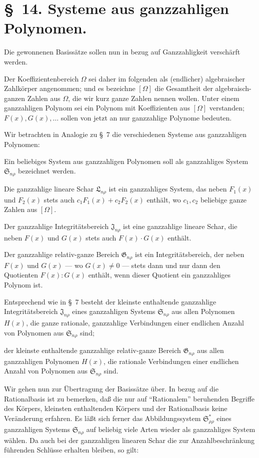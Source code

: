 \documentclass[11pt]{article}
\providecommand{\Ssys}{\mathfrak{S}}
\providecommand{\Jdom}{\mathfrak{J}}
\providecommand{\Gdom}{\mathfrak{G}}
\providecommand{\Lsys}{\mathfrak{L}}
\begin{document}
\section*{\S\ 14. Systeme aus ganzzahligen Polynomen.}

Die gewonnenen Basissätze sollen nun in bezug auf Ganzzahligkeit verschärft werden.

Der Koeffizientenbereich $\Omega$ sei daher im folgenden als (endlicher) algebraischer Zahlkörper angenommen; und es bezeichne $[\Omega]$ die Gesamtheit der algebraisch-ganzen Zahlen aus $\Omega$, die wir kurz ganze Zahlen nennen wollen. Unter einem ganzzahligen Polynom sei ein Polynom mit Koeffizienten aus $[\Omega]$ verstanden; $F(x),G(x),\ldots$ sollen von jetzt an nur ganzzahlige Polynome bedeuten.

Wir betrachten in Analogie zu \S\ 7 die verschiedenen Systeme aus ganzzahligen Polynomen:

Ein beliebiges System aus ganzzahligen Polynomen soll als ganzzahliges System $\Ssys_{n\rho}$ bezeichnet werden.

Die ganzzahlige lineare Schar $\Lsys_{n\rho}$ ist ein ganzzahliges System, das neben $F_1(x)$ und $F_2(x)$ stets auch $c_1F_1(x)+c_2F_2(x)$ enthält, wo $c_1,c_2$ beliebige ganze Zahlen aus $[\Omega]$.

Der ganzzahlige Integritätsbereich $\Jdom_{n\rho}$ ist eine ganzzahlige lineare Schar, die neben $F(x)$ und $G(x)$ stets auch $F(x)\cdot G(x)$ enthält.

Der ganzzahlige relativ-ganze Bereich $\Gdom_{n\rho}$ ist ein Integritätsbereich, der neben $F(x)$ und $G(x)$ --- wo $G(x)\ne0$ --- stets dann und nur dann den Quotienten $F(x):G(x)$ enthält, wenn dieser Quotient ein ganzzahliges Polynom ist.

Entsprechend wie in \S\ 7 besteht der kleinste enthaltende ganzzahlige Integritätsbereich $\Jdom_{n\rho}$ eines ganzzahligen Systems $\Ssys_{n\rho}$ aus allen Polynomen $H(x)$, die ganze rationale, ganzzahlige Verbindungen einer endlichen Anzahl von Polynomen aus $\Ssys_{n\rho}$ sind;

der kleinste enthaltende ganzzahlige relativ-ganze Bereich $\Gdom_{n\rho}$ aus allen ganzzahligen Polynomen $H(x)$, die rationale Verbindungen einer endlichen Anzahl von Polynomen aus $\Ssys_{n\rho}$ sind.

Wir gehen nun zur Übertragung der Basissätze über. In bezug auf die Rationalbasis ist zu bemerken, daß die nur auf ``Rationalem'' beruhenden Begriffe des Körpers, kleinsten enthaltenden Körpers und der Rationalbasis keine Veränderung erfahren. Es läßt sich ferner das Abbildungssystem $\Ssys^*_{\rho\rho}$ eines ganzzahligen Systems $\Ssys_{n\rho}$ auf beliebig viele Arten wieder als ganzzahliges System wählen. Da auch bei der ganzzahligen linearen Schar die zur Anzahlbeschränkung führenden Schlüsse erhalten bleiben, so gilt:
\end{document}
